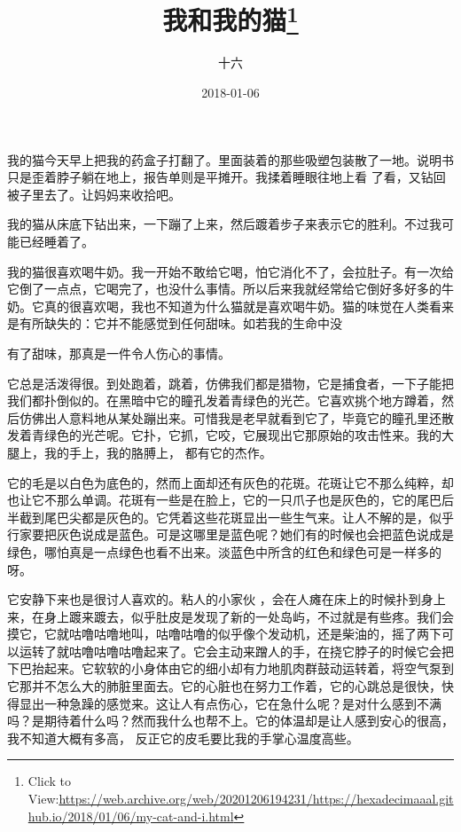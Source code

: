 \documentclass{article}
\title{我和我的猫\footnote{Click to View:\url{https://web.archive.org/web/20201206194231/https://hexadecimaaal.github.io/2018/01/06/my-cat-and-i.html}}}
\author{十六}
\date{2018-01-06}
\begin{document}

\maketitle


\Large

﻿我的猫今天早上把我的药盒子打翻了。里面装着的那些吸塑包装散了一地。说明书只是歪着脖子躺在地上，报告单则是平摊开。我揉着睡眼往地上看
了看，又钻回被子里去了。让妈妈来收拾吧。 

我的猫从床底下钻出来，一下蹦了上来，然后踱着步子来表示它的胜利。不过我可能已经睡着了。
 

我的猫很喜欢喝牛奶。我一开始不敢给它喝，怕它消化不了，会拉肚子。有一次给它倒了一点点，它喝完了，也没什么事情。所以后来我就经常给它倒好多好多的牛奶。它真的很喜欢喝，我也不知道为什么猫就是喜欢喝牛奶。猫的味觉在人类看来是有所缺失的：它并不能感觉到任何甜味。如若我的生命中没
\newpage

有了甜味，那真是一件令人伤心的事情。 

它总是活泼得很。到处跑着，跳着，仿佛我们都是猎物，它是捕食者，一下子能把我们都扑倒似的。在黑暗中它的瞳孔发着青绿色的光芒。它喜欢挑个地方蹲着，然后仿佛出人意料地从某处蹦出来。可惜我是老早就看到它了，毕竟它的瞳孔里还散发着青绿色的光芒呢。它扑，它抓，它咬，它展现出它那原始的攻击性来。我的大腿上，我的手上，我的胳膊上，
都有它的杰作。 

它的毛是以白色为底色的，然而上面却还有灰色的花斑。花斑让它不那么纯粹，却也让它不那么单调。花斑有一些是在脸上，它的一只爪子也是灰色的，它的尾巴后半截到尾巴尖都是灰色的。它凭着这些花斑显出一些生气来。让人不解的是，似乎行家要把灰色说成是蓝色。可是这哪里是蓝色呢？她们有的时候也会把蓝色说成是绿色，哪怕真是一点绿色也看不出来。淡蓝色中所含的红色和绿色可是一样多的呀。

它安静下来也是很讨人喜欢的。粘人的小家伙
\newpage
，会在人瘫在床上的时候扑到身上来，在身上踱来踱去，似乎肚皮是发现了新的一处岛屿，不过就是有些疼。我们会摸它，它就咕噜咕噜地叫，咕噜咕噜的似乎像个发动机，还是柴油的，摇了两下可以运转了就咕噜咕噜咕噜起来了。它会主动来蹭人的手，在挠它脖子的时候它会把下巴抬起来。它软软的小身体由它的细小却有力地肌肉群鼓动运转着，将空气泵到它那并不怎么大的肺脏里面去。它的心脏也在努力工作着，它的心跳总是很快，快得显出一种急躁的感觉来。这让人有点伤心，它在急什么呢？是对什么感到不满吗？是期待着什么吗？然而我什么也帮不上。它的体温却是让人感到安心的很高，我不知道大概有多高，
反正它的皮毛要比我的手掌心温度高些。 
\end{document}

